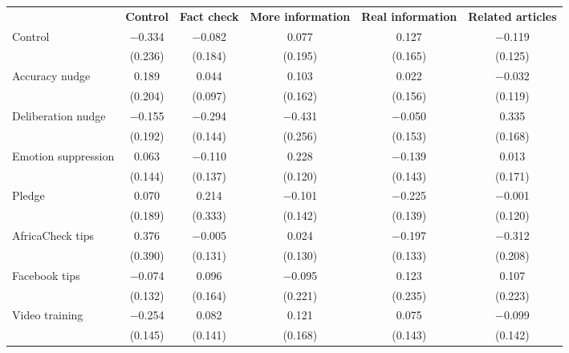 
\begin{tabular}[t]{lccccc}
 & \textbf{Control} & \textbf{Fact check} & \textbf{More information} & \textbf{Real information} & \textbf{Related articles}\\ 
 \cmidrule(lr){2-2} \cmidrule(lr){3-3}\cmidrule(lr){4-4}\cmidrule(lr){5-5}\cmidrule(lr){6-6}
Control & \num{-0.334} & \num{-0.082} & \num{0.077} & \num{0.127} & \num{-0.119}\\
 & (\num{0.236}) & (\num{0.184}) & (\num{0.195}) & (\num{0.165}) & (\num{0.125})\\
Accuracy nudge & \num{0.189} & \num{0.044} & \num{0.103} & \num{0.022} & \num{-0.032}\\
 & (\num{0.204}) & (\num{0.097}) & (\num{0.162}) & (\num{0.156}) & (\num{0.119})\\
Deliberation nudge & \num{-0.155} & \num{-0.294} & \num{-0.431} & \num{-0.050} & \num{0.335}\\
 & (\num{0.192}) & (\num{0.144}) & (\num{0.256}) & (\num{0.153}) & (\num{0.168})\\
Emotion suppression & \num{0.063} & \num{-0.110} & \num{0.228} & \num{-0.139} & \num{0.013}\\
 & (\num{0.144}) & (\num{0.137}) & (\num{0.120}) & (\num{0.143}) & (\num{0.171})\\
Pledge & \num{0.070} & \num{0.214} & \num{-0.101} & \num{-0.225} & \num{-0.001}\\
 & (\num{0.189}) & (\num{0.333}) & (\num{0.142}) & (\num{0.139}) & (\num{0.120})\\
AfricaCheck tips & \num{0.376} & \num{-0.005} & \num{0.024} & \num{-0.197} & \num{-0.312}\\
 & (\num{0.390}) & (\num{0.131}) & (\num{0.130}) & (\num{0.133}) & (\num{0.208})\\
Facebook tips & \num{-0.074} & \num{0.096} & \num{-0.095} & \num{0.123} & \num{0.107}\\
 & (\num{0.132}) & (\num{0.164}) & (\num{0.221}) & (\num{0.235}) & (\num{0.223})\\
Video training & \num{-0.254} & \num{0.082} & \num{0.121} & \num{0.075} & \num{-0.099}\\
 & (\num{0.145}) & (\num{0.141}) & (\num{0.168}) & (\num{0.143}) & (\num{0.142})\\
\bottomrule
\end{tabular}
